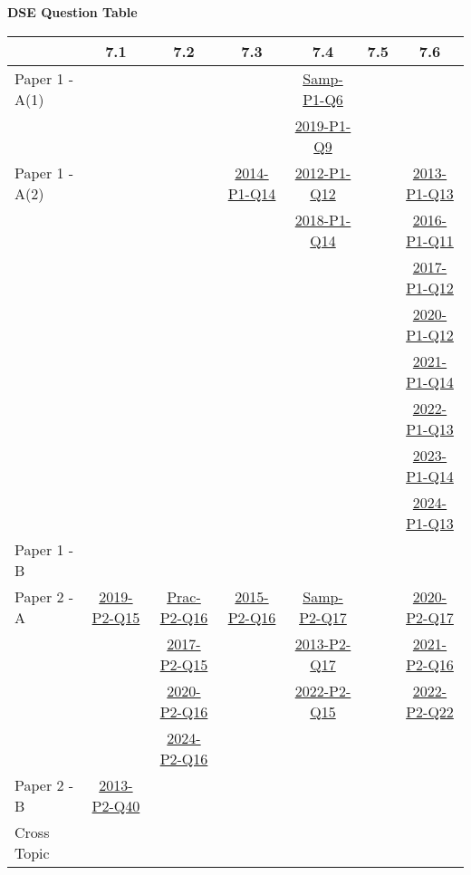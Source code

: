 \documentclass[12pt, a4paper]{article}
\begin{document}
\begin{absolutelynopagebreak}
\begin{center}
\textbf{DSE Question Table}
\end{center}
\begin{center}
\begin{tabular}{|l|c|c|c|c|c|c|}
\hline
        & 7.1 & 7.2 & 7.3 & 7.4 & 7.5 & 7.6 \\\hline
\hline
Paper 1 - A(1)&  &  &  & \hyperref[DSE2012S-CoreP1-Q06]{Samp-P1-Q6} &  &  \\
&  &  &  & \hyperref[DSE2019-CoreP1-Q09]{2019-P1-Q9} &  &  \\
\hline
Paper 1 - A(2)&  &  & \hyperref[DSE2014-CoreP1-Q14]{2014-P1-Q14} & \hyperref[DSE2012-CoreP1-Q12]{2012-P1-Q12} &  & \hyperref[DSE2013-CoreP1-Q13]{2013-P1-Q13} \\
&  &  &  & \hyperref[DSE2018-CoreP1-Q14]{2018-P1-Q14} &  & \hyperref[DSE2016-CoreP1-Q11]{2016-P1-Q11} \\
&  &  &  &  &  & \hyperref[DSE2017-CoreP1-Q12]{2017-P1-Q12} \\
&  &  &  &  &  & \hyperref[DSE2020-CoreP1-Q12]{2020-P1-Q12} \\
&  &  &  &  &  & \hyperref[DSE2021-CoreP1-Q14]{2021-P1-Q14} \\
&  &  &  &  &  & \hyperref[DSE2022-CoreP1-Q13]{2022-P1-Q13} \\
&  &  &  &  &  & \hyperref[DSE2023-CoreP1-Q14]{2023-P1-Q14} \\
&  &  &  &  &  & \hyperref[DSE2024-CoreP1-Q13]{2024-P1-Q13} \\
\hline
Paper 1 - B&  &  &  &  &  &  \\
\hline
\hline
Paper 2 - A& \hyperref[DSE2019-CoreP2-Q15]{2019-P2-Q15} & \hyperref[DSE2012P-CoreP2-Q16]{Prac-P2-Q16} & \hyperref[DSE2015-CoreP2-Q16]{2015-P2-Q16} & \hyperref[DSE2012S-CoreP2-Q17]{Samp-P2-Q17} &  & \hyperref[DSE2020-CoreP2-Q17]{2020-P2-Q17} \\
&  & \hyperref[DSE2017-CoreP2-Q15]{2017-P2-Q15} &  & \hyperref[DSE2013-CoreP2-Q17]{2013-P2-Q17} &  & \hyperref[DSE2021-CoreP2-Q16]{2021-P2-Q16} \\
&  & \hyperref[DSE2020-CoreP2-Q16]{2020-P2-Q16} &  & \hyperref[DSE2022-CoreP2-Q15]{2022-P2-Q15} &  & \hyperref[DSE2022-CoreP2-Q22]{2022-P2-Q22} \\
&  & \hyperref[DSE2024-CoreP2-Q16]{2024-P2-Q16} &  &  &  &  \\
\hline
Paper 2 - B& \hyperref[DSE2013-CoreP2-Q40]{2013-P2-Q40} &  &  &  &  &  \\
\hline
\hline
Cross Topic&  &  &  &  &  &  \\
\hline
\end{tabular}
\end{center}
\end{absolutelynopagebreak}
\end{document}
